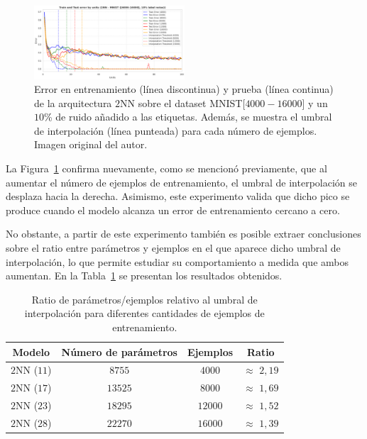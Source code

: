 \begin{figure}[h]
    \centering
    \includegraphics[width=0.5\textwidth]{img/experiments/ratioparamsexamples.png}
    \caption[Ratio parámetros frente a número de ejemplos en el doble descenso.]{Error en entrenamiento (línea discontinua) y prueba (línea continua) de la arquitectura $2$NN sobre el dataset MNIST[$4000-16000$] y un $10$\% de ruido añadido a las etiquetas. Además, se muestra el umbral de interpolación (línea punteada) para cada número de ejemplos. Imagen original del autor.}\label{fig:ratioparamsexamples}
\end{figure}

La Figura~\ref{fig:ratioparamsexamples} confirma nuevamente, como se mencionó previamente, que al aumentar el número de ejemplos de entrenamiento, el umbral de interpolación se desplaza hacia la derecha. Asimismo, este experimento valida que dicho pico se produce cuando el modelo alcanza un error de entrenamiento cercano a cero.\newline

No obstante, a partir de este experimento también es posible extraer conclusiones sobre el ratio entre parámetros y ejemplos en el que aparece dicho umbral de interpolación, lo que permite estudiar su comportamiento a medida que ambos aumentan. En la Tabla~\ref{tab:ratioparamsexamples} se presentan los resultados obtenidos.\newline

\begin{table}[h]
    \centering
    \begin{tabular}{|c|c|c|c|}
    \hline
    \textbf{Modelo}       & \textbf{Número de parámetros} & \textbf{Ejemplos} & \textbf{Ratio} \\ 
    \hline
    $2$NN ($11$)          & $8755$   & $4000$  &  $\approx$ $2,19$  \\ 
    $2$NN ($17$)          & $13525$   & $8000$  &  $\approx$ $1,69$  \\ 
    $2$NN ($23$)          & $18295$   & $12000$  &  $\approx$ $1,52$  \\ 
    $2$NN ($28$)          & $22270$   & $16000$  &  $\approx$ $1,39$  \\ 
    \hline
    \end{tabular}
    \caption[Resumen del ratio parámetros/ejemplos.]{Ratio de parámetros/ejemplos relativo al umbral de interpolación para diferentes cantidades de ejemplos de entrenamiento.}\label{tab:ratioparamsexamples}
\end{table}

